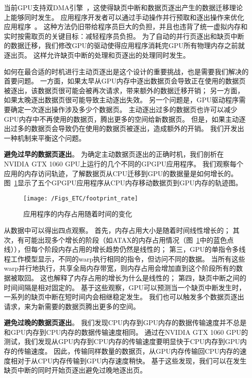 当前GPU支持双DMA引擎~，这使得缺页中断和数据页逐出产生的数据迁移理论上能够同时发生。
应用程序开发者可以通过手动操作并行预取和逐出操作来优化应用程序~。
这种方法仍旧带给程序员巨大的负担，并且也违背了统一虚拟内存和实时按需取页的关键目标：减轻程序员负担。
为了自动的并行页逐出和缺页中断的数据迁移，我们修改GPU的驱动使得应用程序消耗完GPU所有物理内存之前就逐出页。
这样允许缺页中断的处理和页逐出的处理同时发生。

如何在最合适的时机进行主动页逐出是这个设计的重要挑战，也是需要我们解决的首要问题。
一方面，如果太早从GPU内存中逐出数据页会导致正在使用的数据页被逐出，该数据页很可能会被再次请求，带来额外的数据迁移开销；
另一方面，如果太晚逐出数据页很可能导致主动逐出失效。
另一个问题是，GPU驱动程序需要确定一次逐出操作涉及多少个数据页。
主动逐出过多的数据页也许可以减少GPU内存中不再使用的数据页，腾出更多的空间给新数据页。
但是，如果主动逐出过多的数据页会导致仍在使用的数据页被逐出，造成额外的开销。
我们开发出一种机制来平衡这个问题。

\textbf{避免过早的数据页逐出}。
为确定主动数据页逐出的正确时机，我们剖析在NVIDIA GTX 1060 GPU上运行的几个不同的GPGPU应用程序。
我们观察每个应用的内存访问轨迹，了解数据页从CPU迁移到GPU的数据量是如何增长的。
图~\ref{fig:footprint_rate}显示了五个GPGPU应用程序从CPU内存移动数据页到GPU内存的轨迹图。

\begin{figure}[htbp] %
  \centering
  \texttt{[image: /Figs\_ETC/footprint\_rate]}
  \caption{应用程序的内存占用随着时间的变化}
  \label{fig:footprint_rate}
\end{figure}


从数据中可以得出四点观察。
首先，内存占用大小是随着时间线性增长的；
其次，有可能出现多个增长的阶段（如ATAX的内存占用情况（图~\ref{fig:footprint_rate}中的蓝色点线）），但每个阶段内存占用的增长趋势仍然是线性的；
第三，GPU的单指令多线程工作模型显示，不同的warp执行相同的指令，但访问不同的数据。
当所有这些warp并行地执行，共享全局内存带宽，则内存占用会增加直到这个阶段所有的数据被取回。
这也解释了内存占用的增长为什么是线性的；
第四，缺页中断之间的时间间隔是相对固定的。
基于这些观察，GPU可以预测当一个缺页中断发生时，一系列的缺页中断在短时间内会相继稳定发生。
我们也可以触发多个数据页逐出请求，来为新需要的数据页腾出更多的空间。

\textbf{避免过晚的数据页逐出}。
我们发现CPU内存到GPU内存的数据传输速度并不总是和GPU内存到CPU内存的数据传输速度相同。
通过在NVIDIA GTX 1060 GPU的测试，我们发现从GPU内存到CPU内存的传输速度要明显快于CPU内存到GPU内存的传输速度。
因此，传输同样数量的数据页，从GPU内存传输回CPU内存的速度相对于从CPU内存传输到GPU内存速度稍快。
基于这些发现，我们可以在发生缺页中断的同时开始页逐出避免过晚地逐出页。

